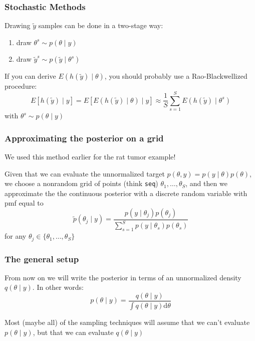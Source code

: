 \documentclass{beamer}
\begin{document}
\begin{frame}
\frametitle{Stochastic Methods}

Drawing $\tilde{y}$ samples can be done in a two-stage way:
\begin{enumerate}
\item draw $\theta^s \sim p(\theta \mid y)$
\item draw $\tilde{y}^s \sim p(\tilde{y} \mid \theta^s)$
\end{enumerate}
\pause

If you can derive $E\left( h(\tilde{y}) \mid \theta \right)$, you should probably use a Rao-Blackwellized procedure:
\[
E[h(\tilde{y}) \mid y] = E[E\left( h(\tilde{y}) \mid \theta \right) \mid y] \approx \frac{1}{S} \sum_{s=1}^S E\left( h(\tilde{y}) \mid \theta^s \right)
\]
with $\theta^s \sim p(\theta \mid y)$


\end{frame}
\begin{frame}[fragile]
\frametitle{Approximating the posterior on a grid}

We used this method earlier for the rat tumor example!
\newline

Given that we can evaluate the unnormalized target $p(\theta, y) = p(y \mid \theta)p(\theta)$, we choose a nonrandom grid of points (think \verb|seq|) $\theta_1, \ldots, \theta_S$, and then we approximate the the continuous posterior with a discrete random variable with pmf equal to
\[
\tilde{p}(\theta_j \mid y) = \frac{p(y \mid \theta_j)p(\theta_j)}{\sum_{s=1}^S p(y \mid \theta_s)p(\theta_s) }
\]
for any $\theta_j \in \{\theta_1, \ldots, \theta_S\}$

\end{frame}

\begin{frame}[fragile]
\frametitle{The general setup}

From now on we will write the posterior in terms of an unnormalized density $q(\theta \mid y)$. In other words:
\[
p(\theta \mid y) = \frac{q(\theta \mid y)}{ \int q(\theta \mid y) \text{d}\theta}
\]

Most (maybe all) of the sampling techniques will assume that we can't evaluate $p(\theta \mid y)$, but that we can evaluate $q(\theta \mid y)$

\end{frame}
\end{document}
